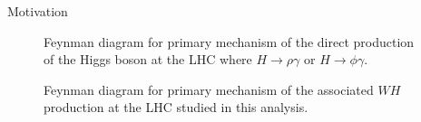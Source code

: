 \begin{section}{Motivation}
\begin{figure}[htb]
\begin{center}
\subfloat      {
\scalebox{.45}[0.45]{}
}\quad
\subfloat      {
\scalebox{.45}[0.45]{}
}
\end{center}
\caption{Feynman diagram\cite{cite-tikz-feynman} for primary mechanism of the direct production of the Higgs boson at the LHC where $H \rightarrow \rho\gamma$ or $H \rightarrow \phi\gamma$.}
\label{fig:direct-prod}
\end{figure}

\begin{figure}[htb]
\begin{center}
\subfloat      {
\scalebox{.55}[0.55]{}
}\quad
\subfloat      {
\scalebox{.55}[0.55]{}
}
\end{center}
\caption{Feynman diagram\cite{cite-tikz-feynman} for primary mechanism of the associated $WH$ production at the LHC studied in this analysis.}
\label{fig:whiggs-prod}
\end{figure}

\end{section}

